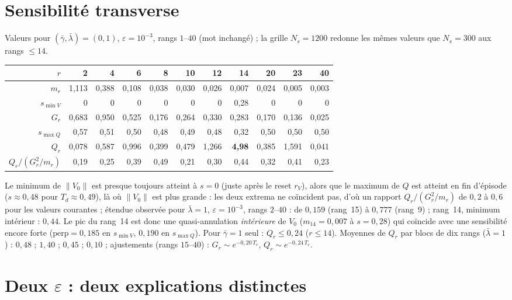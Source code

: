 \documentclass[11pt,a4paper]{article}
\theoremstyle{remark}
\newcommand{\norm}[1]{\lVert #1\rVert}
\begin{document}
\section{Sensibilit\'e transverse}\label{sec:Q}
Valeurs pour $(\bar\gamma,\bar\lambda)=(0,1)$, $\varepsilon=10^{-3}$, rangs $1$--$40$ (mot inchang\'e) ; la grille $N_s=1200$ redonne les m\^emes valeurs que $N_s=300$ aux rangs $\le14$.
\begin{center}\small
\begin{tabular}{r|rrrrrrrrrr}
\toprule
$r$ & 2 & 4 & 6 & 8 & 10 & 12 & 14 & 20 & 23 & 40\\
\midrule
$m_r$ & 1,113 & 0,388 & 0,108 & 0,038 & 0,030 & 0,026 & 0,007 & 0,024 & 0,005 & 0,003\\
$s_{\min V}$ & 0 & 0 & 0 & 0 & 0 & 0 & 0,28 & 0 & 0 & 0\\
$G_r$ & 0,683 & 0,950 & 0,525 & 0,176 & 0,264 & 0,330 & 0,283 & 0,170 & 0,136 & 0,025\\
$s_{\max Q}$ & 0,57 & 0,51 & 0,50 & 0,48 & 0,49 & 0,48 & 0,32 & 0,50 & 0,50 & 0,50\\
$Q_r$ & 0,078 & 0,587 & 0,996 & 0,399 & 0,479 & 1,266 & \textbf{4,98} & 0,385 & 1,591 & 0,041\\
$Q_r/(G_r^2/m_r)$ & 0,19 & 0,25 & 0,39 & 0,49 & 0,21 & 0,30 & 0,44 & 0,32 & 0,41 & 0,23\\
\bottomrule
\end{tabular}
\end{center}
Le minimum de $\norm{V_0}$ est presque toujours atteint \`a $s=0$ (juste apr\`es le reset $r_V$), alors que le maximum de $Q$ est atteint en fin d'\'episode ($s\approx0{,}48$ pour $T_d\approx0{,}49$), l\`a o\`u $\norm{V_0}$ est plus grande : les deux extrema ne coïncident pas, d'o\`u un rapport $Q_r/(G_r^2/m_r)$ de $0{,}2$ \`a $0{,}6$ pour les valeurs courantes ; \'etendue observ\'ee pour $\bar\lambda=1$, $\varepsilon=10^{-3}$, rangs $2$--$40$ : de $0{,}159$ (rang~15) \`a $0{,}777$ (rang~9) ; rang~14, minimum int\'erieur : $0{,}44$. Le pic du rang~14 est donc une quasi-annulation \emph{int\'erieure} de $V_0$ ($m_{14}=0{,}007$ \`a $s=0{,}28$) qui coïncide avec une sensibilit\'e encore forte ($\mathrm{perp}=0{,}185$ en $s_{\min V}$, $0{,}190$ en $s_{\max Q}$). Pour $\bar\gamma=1$ seul : $Q_r\le0{,}24$ ($r\le14$). Moyennes de $Q_r$ par blocs de dix rangs ($\bar\lambda=1$) : $0{,}48$ ; $1{,}40$ ; $0{,}45$ ; $0{,}10$ ; ajustements (rangs $15$--$40$) : $G_r\sim e^{-0{,}20\,T_r}$, $Q_r\sim e^{-0{,}24\,T_r}$.

\section{Deux $\varepsilon$ : deux explications distinctes}\label{sec:eps}
\end{document}
